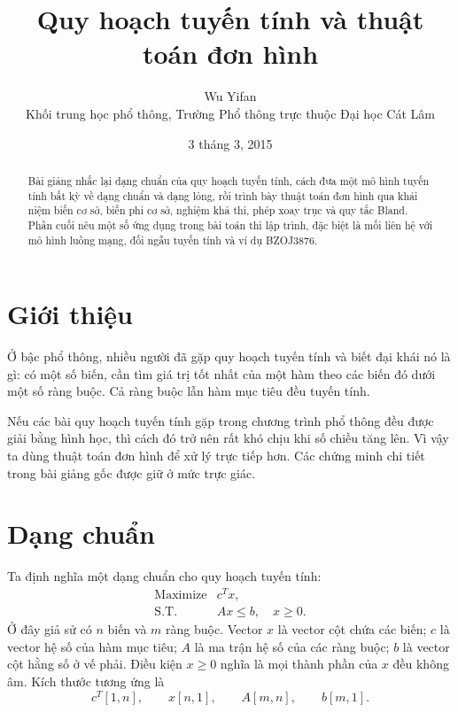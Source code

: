 \documentclass[11pt]{article}
\title{Quy hoạch tuyến tính và thuật toán đơn hình}
\author{Wu Yifan\\Khối trung học phổ thông, Trường Phổ thông trực thuộc Đại học Cát Lâm}
\date{3 tháng 3, 2015}
\newcommand{\ST}{\text{S.T.}}
\begin{document}
\maketitle


\begin{abstract}
Bài giảng nhắc lại dạng chuẩn của quy hoạch tuyến tính, cách đưa một mô
hình tuyến tính bất kỳ về dạng chuẩn và dạng lỏng, rồi trình bày thuật toán
đơn hình qua khái niệm biến cơ sở, biến phi cơ sở, nghiệm khả thi, phép
xoay trục và quy tắc Bland. Phần cuối nêu một số ứng dụng trong bài toán thi
lập trình, đặc biệt là mối liên hệ với mô hình luồng mạng, đối ngẫu tuyến
tính và ví dụ BZOJ3876.
\end{abstract}

\tableofcontents

\section{Giới thiệu}

Ở bậc phổ thông, nhiều người đã gặp quy hoạch tuyến tính và biết đại khái
nó là gì: có một số biến, cần tìm giá trị tốt nhất của một hàm theo các biến
đó dưới một số ràng buộc. Cả ràng buộc lẫn hàm mục tiêu đều tuyến tính.

Nếu các bài quy hoạch tuyến tính gặp trong chương trình phổ thông đều được
giải bằng hình học, thì cách đó trở nên rất khó chịu khi số chiều tăng lên.
Vì vậy ta dùng thuật toán đơn hình để xử lý trực tiếp hơn. Các chứng minh
chi tiết trong bài giảng gốc được giữ ở mức trực giác.

\section{Dạng chuẩn}

Ta định nghĩa một dạng chuẩn cho quy hoạch tuyến tính:
\[
  \begin{array}{ll}
  \text{Maximize} & c^T x,\\
  \ST & Ax\le b,\quad x\ge 0.
  \end{array}
\]
Ở đây giả sử có \(n\) biến và \(m\) ràng buộc. Vector \(x\) là vector cột
chứa các biến; \(c\) là vector hệ số của hàm mục tiêu; \(A\) là ma trận hệ
số của các ràng buộc; \(b\) là vector cột hằng số ở vế phải. Điều kiện
\(x\ge 0\) nghĩa là mọi thành phần của \(x\) đều không âm. Kích thước tương
ứng là
\[
  c^T[1,n],\qquad x[n,1],\qquad A[m,n],\qquad b[m,1].
\]
\end{document}

